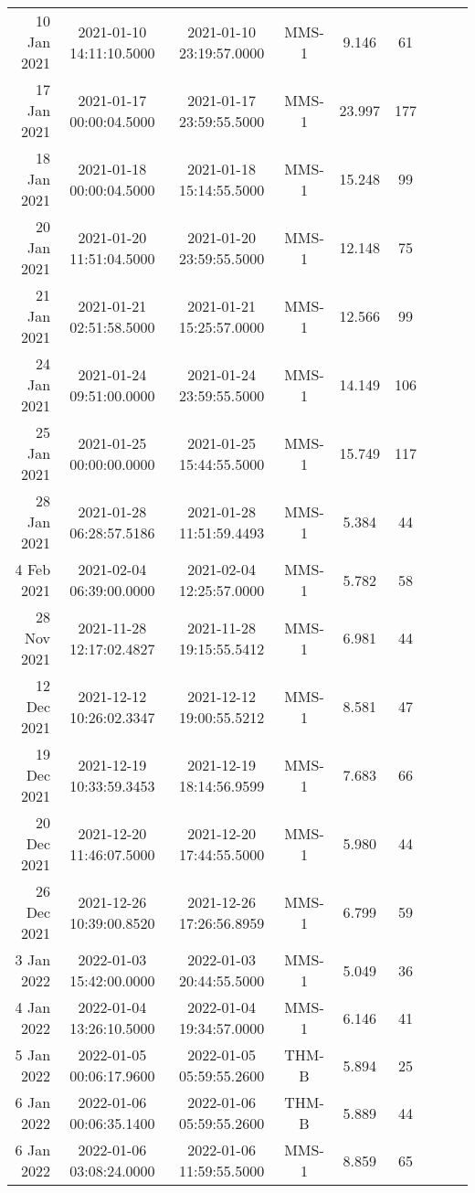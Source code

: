 \begin{longtable}{r|cccccccc}
10 Jan 2021    &  2021-01-10 14:11:10.5000 &  2021-01-10 23:19:57.0000 &  MMS-1 &    9.146 &     61 \\
17 Jan 2021    &  2021-01-17 00:00:04.5000 &  2021-01-17 23:59:55.5000 &  MMS-1 &   23.997 &    177 \\
18 Jan 2021    &  2021-01-18 00:00:04.5000 &  2021-01-18 15:14:55.5000 &  MMS-1 &   15.248 &     99 \\
20 Jan 2021    &  2021-01-20 11:51:04.5000 &  2021-01-20 23:59:55.5000 &  MMS-1 &   12.148 &     75 \\
21 Jan 2021    &  2021-01-21 02:51:58.5000 &  2021-01-21 15:25:57.0000 &  MMS-1 &   12.566 &     99 \\
24 Jan 2021    &  2021-01-24 09:51:00.0000 &  2021-01-24 23:59:55.5000 &  MMS-1 &   14.149 &    106 \\
25 Jan 2021    &  2021-01-25 00:00:00.0000 &  2021-01-25 15:44:55.5000 &  MMS-1 &   15.749 &    117 \\
28 Jan 2021    &  2021-01-28 06:28:57.5186 &  2021-01-28 11:51:59.4493 &  MMS-1 &    5.384 &     44 \\
4 Feb 2021     &  2021-02-04 06:39:00.0000 &  2021-02-04 12:25:57.0000 &  MMS-1 &    5.782 &     58 \\
28 Nov 2021    &  2021-11-28 12:17:02.4827 &  2021-11-28 19:15:55.5412 &  MMS-1 &    6.981 &     44 \\
12 Dec 2021    &  2021-12-12 10:26:02.3347 &  2021-12-12 19:00:55.5212 &  MMS-1 &    8.581 &     47 \\
19 Dec 2021    &  2021-12-19 10:33:59.3453 &  2021-12-19 18:14:56.9599 &  MMS-1 &    7.683 &     66 \\
20 Dec 2021    &  2021-12-20 11:46:07.5000 &  2021-12-20 17:44:55.5000 &  MMS-1 &    5.980 &     44 \\
26 Dec 2021    &  2021-12-26 10:39:00.8520 &  2021-12-26 17:26:56.8959 &  MMS-1 &    6.799 &     59 \\
3 Jan 2022     &  2022-01-03 15:42:00.0000 &  2022-01-03 20:44:55.5000 &  MMS-1 &    5.049 &     36 \\
4 Jan 2022     &  2022-01-04 13:26:10.5000 &  2022-01-04 19:34:57.0000 &  MMS-1 &    6.146 &     41 \\
5 Jan 2022     &  2022-01-05 00:06:17.9600 &  2022-01-05 05:59:55.2600 &  THM-B &    5.894 &     25 \\
6 Jan 2022     &  2022-01-06 00:06:35.1400 &  2022-01-06 05:59:55.2600 &  THM-B &    5.889 &     44 \\
6 Jan 2022     &  2022-01-06 03:08:24.0000 &  2022-01-06 11:59:55.5000 &  MMS-1 &    8.859 &     65 \\

\end{longtable}
